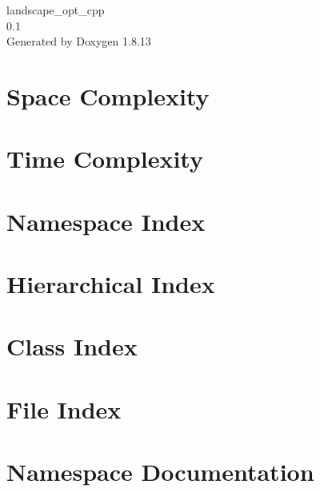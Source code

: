 \documentclass[twoside]{book}
\newcommand{\+}{\discretionary{\mbox{\scriptsize$\hookleftarrow$}}{}{}}
\newcommand{\clearemptydoublepage}{%
  \newpage{\pagestyle{empty}\cleardoublepage}%
}
\begin{document}
\hypersetup{pageanchor=false,
             bookmarksnumbered=true,
             pdfencoding=unicode
            }
\begin{titlepage}
\vspace*{7cm}
\begin{center}%
{\Large landscape\+\_\+opt\+\_\+cpp \\[1ex]\large 0.\+1 }\\
\vspace*{1cm}
{\large Generated by Doxygen 1.8.13}\\
\end{center}
\end{titlepage}
\clearemptydoublepage
{}
\tableofcontents
\clearemptydoublepage
{}
\hypersetup{pageanchor=true}

\chapter{Space Complexity}
\label{space}

\chapter{Time Complexity}
\label{time}

\chapter{Namespace Index}

\chapter{Hierarchical Index}

\chapter{Class Index}

\chapter{File Index}

\chapter{Namespace Documentation}







\end{document}
